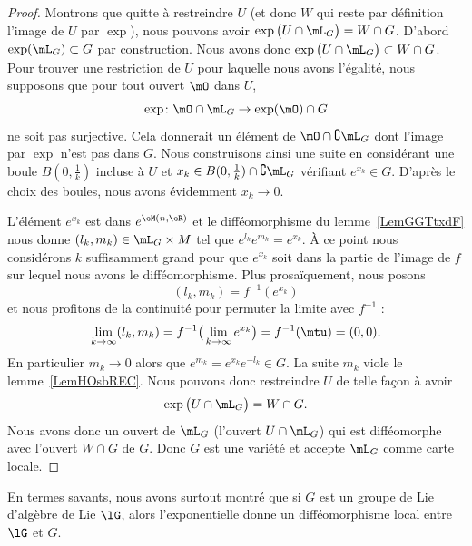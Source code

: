 \begin{proof}
	Montrons que quitte à restreindre \( U\) (et donc \( W\) qui reste par définition l'image de \( U\) par \( \exp\)), nous pouvons avoir \( \exp\big( U\cap\mL_G \big)=W\cap G\). D'abord \( \exp(\mL_G)\subset G\) par construction. Nous avons donc \( \exp\big( U\cap\mL_G \big)\subset W\cap G\). Pour trouver une restriction de \( U\) pour laquelle nous avons l'égalité, nous supposons que pour tout ouvert \( \mO\) dans \( U\),
	\begin{equation}
		\exp\colon \mO\cap\mL_G\to \exp(\mO)\cap G
	\end{equation}
	ne soit pas surjective. Cela donnerait un élément de \( \mO\cap\complement\mL_G\) dont l'image par \( \exp\) n'est pas dans \( G\). Nous construisons ainsi une suite en considérant une boule \( B(0,\frac{1}{ k })\) incluse à \( U\) et \( x_k\in B(0,\frac{1}{ k })\cap\complement\mL_G\) vérifiant \(  e^{x_k}\in G\). D'après le choix des boules, nous avons évidemment \( x_k\to 0\).

	L'élément \(  e^{x_k}\) est dans \(  e^{\eM(n,\eR)}\) et le difféomorphisme du lemme~\ref{LemGGTtxdF} nous donne \( (l_k,m_k)\in \mL_G\times M\) tel que \(  e^{l_k} e^{m_k}= e^{x_k}\). À ce point nous considérons \( k\) suffisamment grand pour que \(  e^{x_k}\) soit dans la partie de l'image de \( f\) sur lequel nous avons le difféomorphisme. Plus prosaïquement, nous posons
	\begin{equation}
		(l_k,m_k)=f^{-1}( e^{x_k})
	\end{equation}
	et nous profitons de la continuité pour permuter la limite avec \( f^{-1}\) :
	\begin{equation}
		\lim_{k\to \infty} (l_k,m_k)=f^{-1}\big( \lim_{k\to \infty}  e^{x_k} \big)=f^{-1}(\mtu)=(0,0).
	\end{equation}
	En particulier \( m_k\to 0\) alors que \(  e^{m_k}= e^{x_k} e^{-l_k}\in G\). La suite \( m_k\) viole le lemme~\ref{LemHOsbREC}. Nous pouvons donc restreindre \( U\) de telle façon à avoir
	\begin{equation}
		\exp\big( U\cap\mL_G \big)=W\cap G.
	\end{equation}
	Nous avons donc un ouvert de \( \mL_G\) (l'ouvert \( U\cap\mL_G\)) qui est difféomorphe avec l'ouvert \( W\cap G\) de \( G\). Donc \( G\) est une variété et accepte \( \mL_G\) comme carte locale.
\end{proof}

\begin{remark}
	En termes savants, nous avons surtout montré que si \( G\) est un groupe de Lie d'algèbre de Lie \( \lG\), alors l'exponentielle donne un difféomorphisme local entre \( \lG\) et \( G\).
\end{remark}

